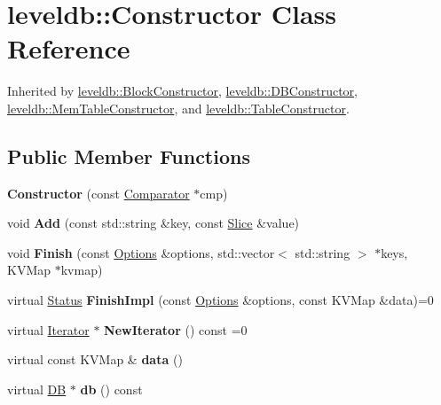 \hypertarget{classleveldb_1_1_constructor}{}\section{leveldb\+::Constructor Class Reference}
\label{classleveldb_1_1_constructor}


Inherited by \mbox{\hyperlink{classleveldb_1_1_block_constructor}{leveldb\+::\+Block\+Constructor}}, \mbox{\hyperlink{classleveldb_1_1_d_b_constructor}{leveldb\+::\+D\+B\+Constructor}}, \mbox{\hyperlink{classleveldb_1_1_mem_table_constructor}{leveldb\+::\+Mem\+Table\+Constructor}}, and \mbox{\hyperlink{classleveldb_1_1_table_constructor}{leveldb\+::\+Table\+Constructor}}.

\subsection*{Public Member Functions}
\begin{DoxyCompactItemize}
\item 
\mbox{\label{classleveldb_1_1_constructor_a5f4d21512e279769e881b2ae85129f08}} 
{\bfseries Constructor} (const \mbox{\hyperlink{structleveldb_1_1_comparator}{Comparator}} $\ast$cmp)
\item 
\mbox{\label{classleveldb_1_1_constructor_a5bb35f87d196065b8357200922aae69f}} 
void {\bfseries Add} (const std\+::string \&key, const \mbox{\hyperlink{classleveldb_1_1_slice}{Slice}} \&value)
\item 
\mbox{\label{classleveldb_1_1_constructor_a5c7f63378f8834cac3be93040e0e49fc}} 
void {\bfseries Finish} (const \mbox{\hyperlink{structleveldb_1_1_options}{Options}} \&options, std\+::vector$<$ std\+::string $>$ $\ast$keys, K\+V\+Map $\ast$kvmap)
\item 
\mbox{\label{classleveldb_1_1_constructor_a0f11e251cfbe990b5b0a4e7040923189}} 
virtual \mbox{\hyperlink{classleveldb_1_1_status}{Status}} {\bfseries Finish\+Impl} (const \mbox{\hyperlink{structleveldb_1_1_options}{Options}} \&options, const K\+V\+Map \&data)=0
\item 
\mbox{\label{classleveldb_1_1_constructor_a362b24b7194f605b655f5a136e0ae43c}} 
virtual \mbox{\hyperlink{classleveldb_1_1_iterator}{Iterator}} $\ast$ {\bfseries New\+Iterator} () const =0
\item 
\mbox{\label{classleveldb_1_1_constructor_a55a0363200d6e86d8beb3b15b75e3824}} 
virtual const K\+V\+Map \& {\bfseries data} ()
\item 
\mbox{\label{classleveldb_1_1_constructor_a19a344a74a682d74633c99352997fa10}} 
virtual \mbox{\hyperlink{classleveldb_1_1_d_b}{DB}} $\ast$ {\bfseries db} () const
\end{DoxyCompactItemize}


